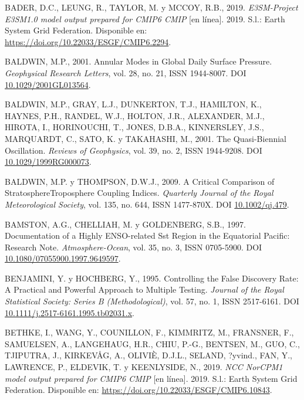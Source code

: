 \documentclass[12pt,oneside,a4paper]{reedthesis}
\newlength{\cslhangindent}
\newenvironment{CSLReferences}[2] %
 {%
  \setlength{\parindent}{0pt}
  \ifodd #1 \everypar{\setlength{\hangindent}{\cslhangindent}}\ignorespaces\fi
  \ifnum #2 > 0
  \setlength{\parskip}{#2\baselineskip}
  \fi
 }%
 {}
\begin{document}
\begin{CSLReferences}{1}{0}
\leavevmode{}%
BADER, D.C., LEUNG, R., TAYLOR, M. y MCCOY, R.B., 2019. \emph{E3SM-Project E3SM1.0 model output prepared for CMIP6 CMIP} {[}en línea{]}. 2019. S.l.: Earth System Grid Federation. Disponible en: \url{https://doi.org/10.22033/ESGF/CMIP6.2294}.

\leavevmode{}%
BALDWIN, M.P., 2001. Annular Modes in Global Daily Surface Pressure. \emph{Geophysical Research Letters}, vol. 28, no. 21, ISSN 1944-8007. DOI \href{https://doi.org/10.1029/2001GL013564}{10.1029/2001GL013564}.

\leavevmode{}%
BALDWIN, M.P., GRAY, L.J., DUNKERTON, T.J., HAMILTON, K., HAYNES, P.H., RANDEL, W.J., HOLTON, J.R., ALEXANDER, M.J., HIROTA, I., HORINOUCHI, T., JONES, D.B.A., KINNERSLEY, J.S., MARQUARDT, C., SATO, K. y TAKAHASHI, M., 2001. The Quasi-Biennial Oscillation. \emph{Reviews of Geophysics}, vol. 39, no. 2, ISSN 1944-9208. DOI \href{https://doi.org/10.1029/1999RG000073}{10.1029/1999RG000073}.

\leavevmode{}%
BALDWIN, M.P. y THOMPSON, D.W.J., 2009. A Critical Comparison of Stratosphere{\textendash}Troposphere Coupling Indices. \emph{Quarterly Journal of the Royal Meteorological Society}, vol. 135, no. 644, ISSN 1477-870X. DOI \href{https://doi.org/10.1002/qj.479}{10.1002/qj.479}.

\leavevmode{}%
BAMSTON, A.G., CHELLIAH, M. y GOLDENBERG, S.B., 1997. Documentation of a Highly {ENSO}-related Sst Region in the Equatorial Pacific: {Research} Note. \emph{Atmosphere-Ocean}, vol. 35, no. 3, ISSN 0705-5900. DOI \href{https://doi.org/10.1080/07055900.1997.9649597}{10.1080/07055900.1997.9649597}.

\leavevmode{}%
BENJAMINI, Y. y HOCHBERG, Y., 1995. Controlling the {False Discovery Rate}: {A Practical} and {Powerful Approach} to {Multiple Testing}. \emph{Journal of the Royal Statistical Society: Series B (Methodological)}, vol. 57, no. 1, ISSN 2517-6161. DOI \href{https://doi.org/10.1111/j.2517-6161.1995.tb02031.x}{10.1111/j.2517-6161.1995.tb02031.x}.

\leavevmode{}%
BETHKE, I., WANG, Y., COUNILLON, F., KIMMRITZ, M., FRANSNER, F., SAMUELSEN, A., LANGEHAUG, H.R., CHIU, P.-G., BENTSEN, M., GUO, C., TJIPUTRA, J., KIRKEVÅG, A., OLIVIÈ, D.J.L., SELAND, ?yvind., FAN, Y., LAWRENCE, P., ELDEVIK, T. y KEENLYSIDE, N., 2019. \emph{NCC NorCPM1 model output prepared for CMIP6 CMIP} {[}en línea{]}. 2019. S.l.: Earth System Grid Federation. Disponible en: \url{https://doi.org/10.22033/ESGF/CMIP6.10843}.


\end{CSLReferences}
\end{document}
